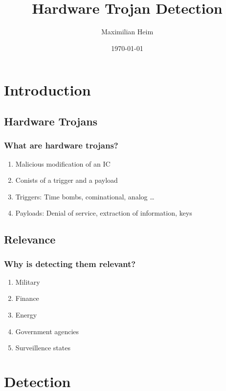 \documentclass[11pt]{beamer}
\author{Maximilian Heim}
\title{Hardware Trojan Detection}
\institute{University Albstadt-Sigmaringen}
\date{\today}
\begin{document}
\begin{frame}
\titlepage
\end{frame}

\begin{frame}
\tableofcontents
\end{frame}

\section{Introduction}
\subsection{Hardware Trojans}
\begin{frame}
    \frametitle{What are hardware trojans?}
    \begin{enumerate}
    \item Malicious modification of an IC
    \item Conists of a trigger and a payload
    \item Triggers: Time bombs, cominational, analog \dots
    \item Payloads: Denial of service, extraction of information, keys
    \end{enumerate}
\end{frame}
\subsection{Relevance}
\begin{frame}
    \frametitle{Why is detecting them relevant?}
    \begin{enumerate}
    \item Military
    \item Finance
    \item Energy
    \item Government agencies
    \item Surveillence states
    \end{enumerate}

\end{frame}


\section{Detection}
\end{document}
